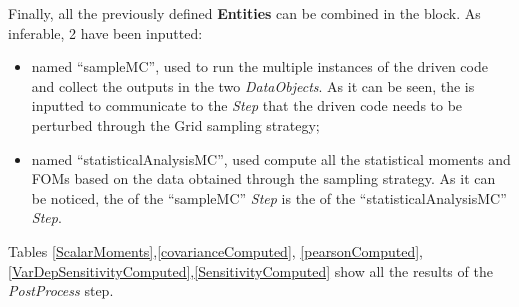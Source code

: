 \begin{enumerate}
   Finally, all the previously defined \textbf{Entities} can be combined in 
   the  block. As inferable, 
   2  have been inputted:
   \begin{itemize}
     \item {} named ``sampleMC'', used to run the 
     multiple  
     instances of the driven code and 
     collect the outputs in the two \textit{DataObjects}. As it can be
     seen, the  is inputted to communicate to the 
     \textit{Step} that the driven code needs to
     be perturbed through the Grid sampling strategy;
     \item {} named ``statisticalAnalysisMC'', used
     compute all the statistical moments and FOMs based on the
     data obtained through the sampling strategy. As it can be noticed, 
     the  of the ``sampleMC'' \textit{Step} is the  
      of the ``statisticalAnalysisMC''  \textit{Step}.
   \end{itemize}
\end{enumerate} 

Tables \ref{ScalarMoments},\ref{covarianceComputed}, \ref{pearsonComputed},\ref{VarDepSensitivityComputed},\ref{SensitivityComputed} show all the results of the \textit{PostProcess} 
step.


